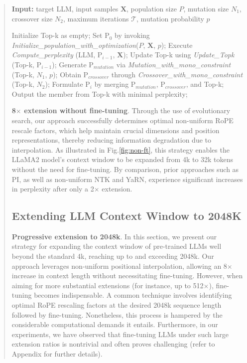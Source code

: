 \begin{abstract}
\begin{algorithm}[t]
	\small
	\caption{The search algorithm}
	\textbf{Input:} target LLM, input samples $\mathbf{X}$, population size $P$, mutation size $N_1$, crossover size $N_2$, maximum iterations $\mathcal{T}$, mutation probability $p$\\

	\begin{algorithmic}[1]
		\label{alg:search}
		\STATE Initialize Top-k as empty;	
		\STATE Set $\text{P}_0$ by invoking \textit{Initialize\_population\_with\_optimization}($P$, $\mathbf{X}$, $p$); 
		\STATE Execute \textit{Compute\_perplexity} (LLM, $\text{P}_{i-1}$, $\mathbf{X}$);
		\STATE Update Top-k using \textit{Update\_Topk} (Top-k, $\text{P}_{i-1}$);
		\STATE Generate $\text{P}_{mutation}$ via \textit{Mutation\_with\_mono\_constraint} (Top-k, $N_1$, $p$); 
		\STATE Obtain $\text{P}_{crossover}$ through \textit{Crossover\_with\_mono\_constraint} (Top-k, $N_2$);
		\STATE Formulate $\text{P}_i$ by merging $\text{P}_{mutation}$, $\text{P}_{crossover}$, and Top-k;
		\ENDFOR
		\STATE Output the member from Top-k with minimal perplexity;
	\end{algorithmic}
\end{algorithm}

\textbf{8$\times$ extension without fine-tuning}. Through the use of evolutionary search, our approach successfully determines optimal non-uniform RoPE rescale factors, which help maintain crucial dimensions and position representations, thereby reducing information degradation due to interpolation. As illustrated in Fig.\ref{fig:non-ft}, this strategy enables the LLaMA2 model's context window to be expanded from 4k to 32k tokens without the need for fine-tuning. By comparison, prior approaches such as PI, as well as non-uniform NTK and YaRN, experience significant increases in perplexity after only a 2$\times$ extension.

\subsection{Extending LLM Context Window to 2048K}
\label{sec:extendto2048k}

\textbf{Progressive extension to 2048k}. In this section, we present our strategy for expanding the context window of pre-trained LLMs well beyond the standard 4k, reaching up to and exceeding 2048k. Our approach leverages non-uniform positional interpolation, allowing an 8$\times$ increase in context length without necessitating fine-tuning. However, when aiming for more substantial extensions (for instance, up to 512$\times$), fine-tuning becomes indispensable. A common technique involves identifying optimal RoPE rescaling factors at the desired 2048k sequence length followed by fine-tuning. Nonetheless, this process is hampered by the considerable computational demands it entails. Furthermore, in our experiments, we have observed that fine-tuning LLMs under such large extension ratios is nontrivial and often proves challenging (refer to Appendix for further details).


\end{abstract}

